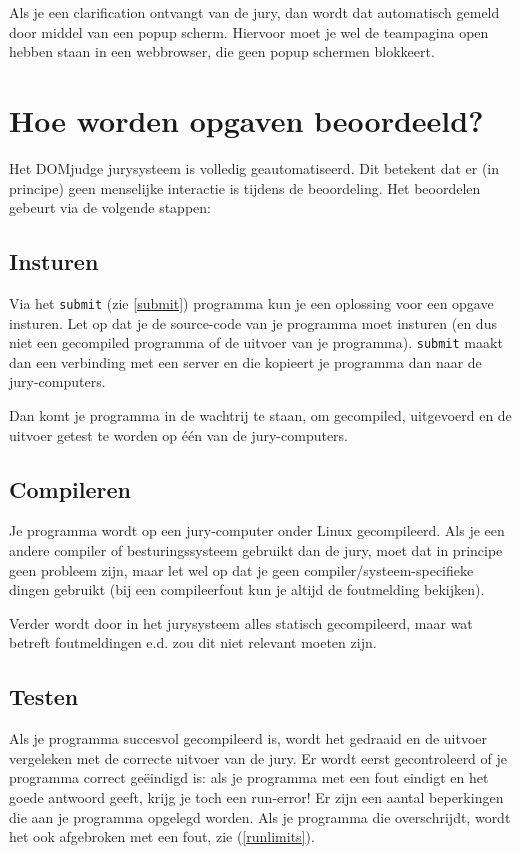 \documentclass[11pt,a4paper]{article}
\newcommand{\DOMjudge}{\textsc{DOM}judge }
\begin{document}
Als je een clarification ontvangt van de jury, dan wordt dat
automatisch gemeld door middel van een popup scherm. Hiervoor moet je
wel de teampagina open hebben staan in een webbrowser, die geen popup
schermen blokkeert.

\section{Hoe worden opgaven beoordeeld?}

Het \DOMjudge jurysysteem is volledig geautomatiseerd. Dit betekent
dat er (in principe) geen menselijke interactie is tijdens de
beoordeling. Het beoordelen gebeurt via de volgende stappen:

\subsection{Insturen}

Via het \texttt{submit} (zie \ref{submit}) programma kun je een
oplossing voor een opgave insturen. Let op dat je de source-code van
je programma moet insturen (en dus niet een gecompiled programma of de
uitvoer van je programma). \texttt{submit} maakt dan een verbinding
met een server en die kopieert je programma dan naar de
jury-computers.

Dan komt je programma in de wachtrij te staan, om gecompiled,
uitgevoerd en de uitvoer getest te worden op \'e\'en van de
jury-computers.

\subsection{Compileren}

Je programma wordt op een jury-computer onder Linux gecompileerd.
Als je een andere compiler of besturingssysteem gebruikt dan de jury,
moet dat in principe geen probleem zijn, maar let wel op dat
je geen compiler/systeem-specifieke dingen gebruikt (bij een
compileerfout kun je altijd de foutmelding bekijken).

Verder wordt door in het jurysysteem alles statisch gecompileerd, maar
wat betreft foutmeldingen e.d. zou dit niet relevant moeten zijn.

\subsection{Testen}

Als je programma succesvol gecompileerd is, wordt het gedraaid en de
uitvoer vergeleken met de correcte uitvoer van de jury. Er wordt eerst
gecontroleerd of je programma correct ge\"eindigd is: als je programma
met een fout eindigt en het goede antwoord geeft, krijg je toch een
run-error! Er zijn een aantal beperkingen die aan je programma
opgelegd worden. Als je programma die overschrijdt, wordt het ook
afgebroken met een fout, zie (\ref{runlimits}).
\end{document}
